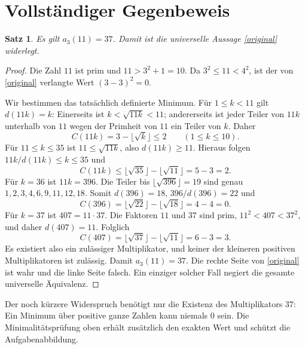 \documentclass[11pt,a4paper]{article}
\newtheorem{satz}{Satz}
\begin{document}
\section{Vollständiger Gegenbeweis}
\begin{satz}\label{counter}
Es gilt $a_3(11)=37$. Damit ist die universelle Aussage \eqref{original} widerlegt.
\end{satz}
\begin{proof}
Die Zahl $11$ ist prim und $11>3^2+1=10$. Da
$3^2\le11<4^2$, ist der von \eqref{original} verlangte Wert
$(3-3)^2=0$.

Wir bestimmen das tatsächlich definierte Minimum.
Für $1\le k<11$ gilt $d(11k)=k$: Einerseits ist $k<\sqrt{11k}<11$;
andererseits ist jeder Teiler von $11k$ unterhalb von $11$ wegen der Primheit von
$11$ ein Teiler von $k$. Daher
\[
 C(11k)=3-\lfloor\sqrt k\rfloor\le2 \qquad(1\le k\le10).
\]
Für $11\le k\le35$ ist $11\le\sqrt{11k}$, also $d(11k)\ge11$.
Hieraus folgen $11k/d(11k)\le k\le35$ und
\[
 C(11k)\le\lfloor\sqrt{35}\rfloor-\lfloor\sqrt{11}\rfloor
 =5-3=2.
\]
Für $k=36$ ist $11k=396$. Die Teiler bis $\lfloor\sqrt{396}\rfloor=19$
sind genau $1,2,3,4,6,9,11,12,18$. Somit $d(396)=18$, $396/d(396)=22$ und
\[
 C(396)=\lfloor\sqrt{22}\rfloor-\lfloor\sqrt{18}\rfloor=4-4=0.
\]
Für $k=37$ ist $407=11\cdot37$. Die Faktoren $11$ und $37$ sind prim,
$11^2<407<37^2$, und daher $d(407)=11$. Folglich
\[
 C(407)=\lfloor\sqrt{37}\rfloor-\lfloor\sqrt{11}\rfloor=6-3=3.
\]
Es existiert also ein zulässiger Multiplikator, und keiner der kleineren positiven
Multiplikatoren ist zulässig. Damit $a_3(11)=37$.
Die rechte Seite von \eqref{original} ist wahr und die linke Seite falsch.
Ein einziger solcher Fall negiert die gesamte universelle Äquivalenz.
\end{proof}

Der noch kürzere Widerspruch benötigt nur die Existenz des Multiplikators $37$:
Ein Minimum über positive ganze Zahlen kann niemals $0$ sein. Die Minimalitätsprüfung
oben erhält zusätzlich den exakten Wert und schützt die Aufgabenabbildung.
\end{document}
